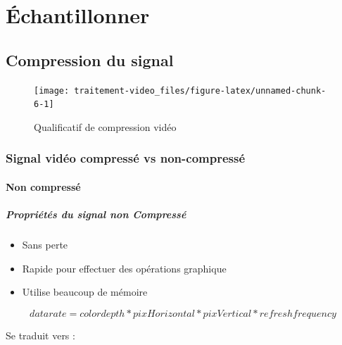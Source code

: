 \documentclass[
  french,
]{book}
\providecommand{\tightlist}{%
  \setlength{\itemsep}{0pt}\setlength{\parskip}{0pt}}
\begin{document}
\hypertarget{echantillonner}{%
\chapter{Échantillonner}\label{echantillonner}}

\hypertarget{compression-du-signal}{%
\section{Compression du signal}\label{compression-du-signal}}

\begin{figure}

{\centering \texttt{[image: traitement-video\_files/figure-latex/unnamed-chunk-6-1]} 

}

\caption{Qualificatif de compression vidéo}\label{fig:unnamed-chunk-6}
\end{figure}

\hypertarget{signal-viduxe9o-compressuxe9-vs-non-compressuxe9}{%
\subsection{Signal vidéo compressé vs non-compressé}\label{signal-viduxe9o-compressuxe9-vs-non-compressuxe9}}

\hypertarget{non-compressuxe9}{%
\subsubsection{Non compressé}\label{non-compressuxe9}}

\hypertarget{propriuxe9tuxe9s-du-signal-non-compressuxe9}{%
\paragraph{Propriétés du signal non Compressé}\label{propriuxe9tuxe9s-du-signal-non-compressuxe9}}

\begin{itemize}
\tightlist
\item
  Sans perte
\item
  Rapide pour effectuer des opérations graphique
\item
  Utilise beaucoup de mémoire
\end{itemize}

\[
data rate = color depth *  pixHorizontal * pixVertical * refresh frequency
\]

Se traduit vers :
\end{document}
